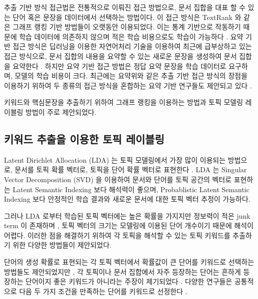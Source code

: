 \documentclass[oneside, ko,phd]{snuthesis_utf8_kor}
\begin{document}
추출 기반 방식 접근법은 전통적으로 이뤄진 접근 방법으로, 문서 집합을 대표 할 수 있는 단어 혹은 문장을 데이터에서 선택하는 방법이다.
이 접근 방식은 TextRank \cite{mihalcea2004textrank} 와 같은 그래프 랭킹 기반 방법들이 오랫동안 이용되었다.
이는 통계 기반으로 작동하기 때문에 학습 데이터에 의존하지 않으며 적은 학습 비용으로도 학습이 가능하다 \cite{parveen2015topical, narayan2018ranking}.
요약 기반 접근 방식은 딥러닝을 이용한 자연어처리 기술을 이용하여 최근에 급부상하고 있는 접근 방식으로, 문서 집합의 내용을 요약할 수 있는 새로운 문장을 생성하여 문서 집합을 요약한다 \cite{nallapati2016abstractive}.
하지만 요약 기반 접근 방법은 정답 요약 문장을 학습 데이터로 요구하며, 모델의 학습 비용이 크다.
최근에는 요약위와 같은 추출 기반 접근 방식의 장점을 이용하기 위하여 두 종류의 접근 방식을 혼합하는 요약 기반 연구들도 제안되고 있다 \cite{banerjee2015multi, bing2015abstractive, gu2016incorporating}.

키워드와 핵심문장을 추출하기 위하여 그래프 랭킹을 이용하는 방법과 토픽 모델링 레이블링 방법이 주로 제안되었다.

\subsection{키워드 추출을 이용한 토픽 레이블링}

Latent Dirichlet Allocation (LDA) 는 토픽 모델링에서 가장 많이 이용되는 방법으로, 문서를 토픽 확률 벡터로, 토픽을 단어 확률 벡터로 표현한다 \cite{blei2003latent}.
LDA 는 Singular Vector Decomposition (SVD) 을 이용하여 문서와 단어를 토픽 공간의 벡터로 표현하는 Latent Semantic Indexing \cite{landauer1998introduction} 보다 해석력이 좋으며, Probablistic Latent Semantic Indexing \cite{hofmann1999probabilistic} 보다 안정적인 학습 결과와 새로운 문서에 대한 토픽 벡터 추정이 가능하다.

그러나 LDA 로부터 학습된 토픽 벡터에는 높은 확률을 가지지만 정보력이 적은 junk term 이 존재하며 \cite{newman2010evaluating}, 토픽 벡터의 크기는 모델링에 이용된 단어 개수이기 때문에 해석이 어렵다.
이러한 점을 해결하기 위하여 각 토픽을 해석할 수 있는 토픽 키워드를 추출하기 위한 다양한 방법들이 제안되었다. 

단어의 생성 확률로 표현되는 각 토픽 벡터에서 확률값이 큰 단어를 키워드로 선택하는 방법들도 제안되었지만 \cite{snyder2013topic, chuang2013topic, wallach2009evaluation}, 각 토픽이나 문서 집합에서 자주 등장하는 단어는 흔하게 등장하는 단어이지 좋은 키워드가 아니라는 주장이 제기되었다 \cite{ramage09tmsocial, newman2010evaluating, chuang2012interpretation}.
다양한 연구들은 공통적으로 다음 두 가지 조건을 만족하는 단어를 키워드로 선정한다 \cite{chuang2012termite}.
\end{document}
